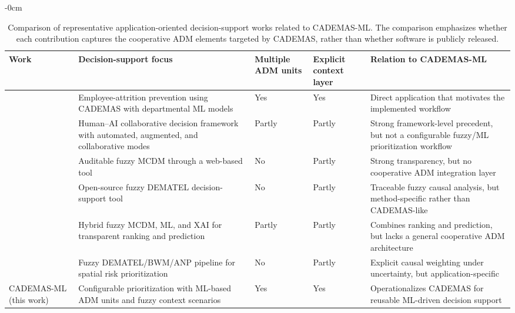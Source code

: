 \documentclass[journal,article,submit,pdftex,moreauthors,mathematics]{Definitions/mdpi}
\begin{document}
\begin{table}[t]
\caption{Comparison of representative application-oriented decision-support works related to CADEMAS-ML. The comparison emphasizes whether each contribution captures the cooperative ADM elements targeted by CADEMAS, rather than whether software is publicly released.\label{tab:related}}
\small
\begin{adjustwidth}{-\extralength}{0cm}
	\begin{tabularx}{\fulllength}{>{\raggedright\arraybackslash}p{2cm} >{\raggedright\arraybackslash}X p{2cm} p{2cm} >{\raggedright\arraybackslash}X}
		\toprule
		\textbf{Work} & \textbf{Decision-support focus} & \textbf{Multiple ADM units} & \textbf{Explicit context layer} & \textbf{Relation to CADEMAS-ML} \\
		\midrule
		\citet{Godz2026} & Employee-attrition prevention using CADEMAS with departmental ML models & Yes & Yes & Direct application that motivates the implemented workflow \\
		\citet{Tariq2024a} & Human--AI collaborative decision framework with automated, augmented, and collaborative modes & Partly & Partly & Strong framework-level precedent, but not a configurable fuzzy/ML prioritization workflow \\
		\citet{Wieckowski2024} & Auditable fuzzy MCDM through a web-based tool & No & Partly & Strong transparency, but no cooperative ADM integration layer \\
		\citet{Chekry2024} & Open-source fuzzy DEMATEL decision-support tool & No & Partly & Traceable fuzzy causal analysis, but method-specific rather than CADEMAS-like \\
		\citet{Ozkurt2025} & Hybrid fuzzy MCDM, ML, and XAI for transparent ranking and prediction & Partly & Partly & Combines ranking and prediction, but lacks a general cooperative ADM architecture \\
		\citet{Sahraei2022} & Fuzzy DEMATEL/BWM/ANP pipeline for spatial risk prioritization & No & Partly & Explicit causal weighting under uncertainty, but application-specific \\
		\midrule
		CADEMAS-ML (this work) & Configurable prioritization with ML-based ADM units and fuzzy context scenarios & Yes & Yes & Operationalizes CADEMAS for reusable ML-driven decision support \\
		\bottomrule
	\end{tabularx}
\end{adjustwidth}
\end{table}
\end{document}
